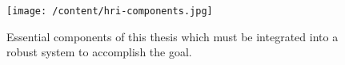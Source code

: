 \begin{figure}
	[h] \centering 
	\texttt{[image: /content/hri-components.jpg]} \caption{Essential components of this thesis which must be integrated into a robust system to accomplish the goal.} \label{fg:hri:components} 
\end{figure}
